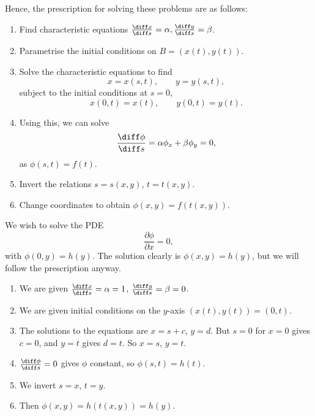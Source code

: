 \documentclass[12pt]{article}
\begin{document}
Hence, the prescription for solving these problems are as follows:
\begin{enumerate}[1.]
	\item Find characteristic equations $\frac{\diff x}{\diff s} = \alpha, \frac{\diff y}{\diff s} = \beta$.
	\item Parametrise the initial conditions on $B = (x(t), y(t))$.
	\item Solve the characteristic equations to find
		\[
			x = x(s, t), \qquad y = y(s, t)
		,\]
		subject to the initial conditions at $s = 0$,
		\[
			x(0, t) = x(t), \qquad y(0, t) = y(t).
		\]
	\item Using this, we can solve
		\[
		\frac{\diff \phi}{\diff s} = \alpha \phi_x + \beta \phi_y = 0
		,\]
		as $\phi(s, t) = f(t)$.
	\item Invert the relations $s = s(x, y)$, $t = t(x, y)$.
	\item Change coordinates to obtain $\phi(x, y) = f(t(x, y))$.
\end{enumerate}

\begin{exbox}
	We wish to solve the PDE
	\[
	\frac{\partial \phi}{\partial x} = 0
	,\]
	with $\phi(0, y) = h(y)$. The solution clearly is $\phi(x, y) = h(y)$, but we will follow the prescription anyway.
	\begin{enumerate}[1.]
		\item We are given $\frac{\diff x}{\diff s} = \alpha = 1$, $\frac{\diff y}{\diff s} = \beta = 0$.
		\item We are given initial conditions on the $y$-axis $(x(t), y(t)) = (0, t)$.
		\item The solutions to the equations are $x = s + c$, $y = d$. But $s = 0$ for $x = 0$ gives $c = 0$, and $y = t$ gives $d = t$. So $x = s$, $y = t$.
		\item $\frac{\diff \phi}{\diff s}= 0$ gives $\phi$ constant, so $\phi(s, t) = h(t)$.
		\item We invert $s = x$, $t = y$.
		\item Then $\phi(x, y) = h(t(x, y)) = h(y)$.
	\end{enumerate}
\end{exbox}
\end{document}
